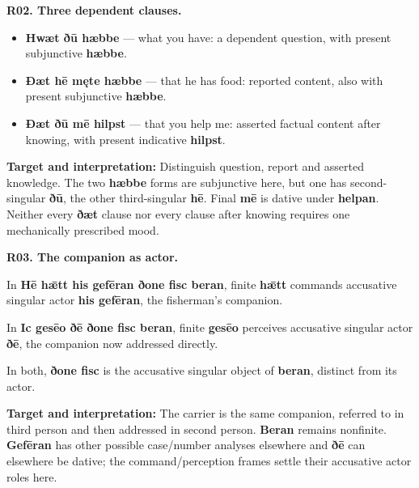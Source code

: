 \par\begin{minipage}{\linewidth}\raggedright
\textbf{R02. Three dependent clauses.}

\begin{itemize}
\item \textbf{Hwæt ðū hæbbe} — what you have: a dependent question, with present subjunctive \textbf{hæbbe}.
\item \textbf{Ðæt hē męte hæbbe} — that he has food: reported content, also with present subjunctive \textbf{hæbbe}.
\item \textbf{Ðæt ðū mē hilpst} — that you help me: asserted factual content after knowing, with present indicative \textbf{hilpst}.
\end{itemize}

\textbf{Target and interpretation:} Distinguish question, report and asserted knowledge. The two \textbf{hæbbe} forms are subjunctive here, but one has second-singular \textbf{ðū}, the other third-singular \textbf{hē}. Final \textbf{mē} is dative under \textbf{helpan}. Neither every \textbf{ðæt} clause nor every clause after knowing requires one mechanically prescribed mood.

\end{minipage}\par\addvspace{4pt}

\par\begin{minipage}{\linewidth}\raggedright
\textbf{R03. The companion as actor.}

In \textbf{Hē hǣtt his gefēran ðone fisc beran}, finite \textbf{hǣtt} commands accusative singular actor \textbf{his gefēran}, the fisherman's companion.

In \textbf{Ic gesēo ðē ðone fisc beran}, finite \textbf{gesēo} perceives accusative singular actor \textbf{ðē}, the companion now addressed directly.

In both, \textbf{ðone fisc} is the accusative singular object of \textbf{beran}, distinct from its actor.

\textbf{Target and interpretation:} The carrier is the same companion, referred to in third person and then addressed in second person. \textbf{Beran} remains nonfinite. \textbf{Gefēran} has other possible case/\allowbreak{}number analyses elsewhere and \textbf{ðē} can elsewhere be dative; the command/\allowbreak{}perception frames settle their accusative actor roles here.

\end{minipage}\par\addvspace{4pt}

